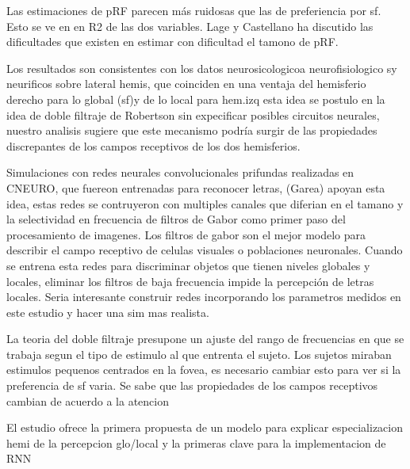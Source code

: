 Las estimaciones de pRF parecen m\'as ruidosas que las de preferiencia por sf. Esto se ve en en R2 de las dos variables. Lage y Castellano ha discutido las dificultades que existen en estimar con dificultad el tamono de pRF. 

Los resultados son consistentes con los datos neurosicologicoa neurofisiologico sy neurificos sobre lateral hemis, que coinciden en una ventaja del hemisferio derecho para lo global (sf)y de lo local para hem.izq  esta idea se postulo en la idea de doble filtraje de Robertson sin expecificar posibles circuitos neurales, nuestro analisis sugiere  que este mecanismo podr\'ia surgir de las propiedades discrepantes de los campos receptivos de los dos hemisferios. 

Simulaciones con redes neurales convolucionales prifundas realizadas en CNEURO, que fuereon entrenadas para reconocer letras, (Garea) apoyan esta idea, estas redes se contruyeron con multiples canales que diferian en el tamano y la selectividad en frecuencia de filtros de Gabor como primer paso del procesamiento de imagenes. Los filtros de gabor son el mejor modelo para describir el campo receptivo de celulas visuales o poblaciones neuronales. Cuando se entrena esta redes para discriminar objetos que tienen niveles globales y locales, eliminar los filtros de baja frecuencia impide la percepci\'on de letras locales. Seria interesante construir redes incorporando los parametros medidos en este estudio y hacer una sim mas realista.

La teoria del doble filtraje presupone un ajuste del rango de frecuencias en que se trabaja segun el tipo de estimulo al que entrenta el sujeto. Los sujetos miraban estimulos pequenos centrados en la fovea, es necesario cambiar esto para ver si la preferencia de sf varia. Se sabe que las propiedades de los campos receptivos cambian de acuerdo a la atencion

El estudio ofrece la primera propuesta de un modelo para explicar especializacion hemi de la percepcion glo/local y la primeras clave para la implementacion de RNN


